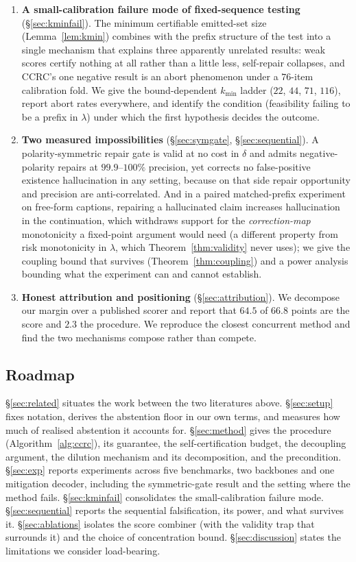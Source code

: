 \documentclass[review,number,doubleblind]{elsarticle}
\theoremstyle{plain}
\theoremstyle{definition}
\theoremstyle{remark}
\begin{document}
\begin{enumerate}
\item \textbf{A small-calibration failure mode of fixed-sequence testing}
(\S\ref{sec:kminfail}). The minimum certifiable emitted-set size (Lemma~\ref{lem:kmin})
combines with the prefix structure of the test into a single mechanism that explains three
apparently unrelated results: weak scores certify nothing at all rather than a little less,
self-repair collapses, and CCRC's one negative result is an abort phenomenon under a $76$-item
calibration fold. We give the bound-dependent $k_{\min}$ ladder ($22$, $44$, $71$, $116$),
report abort rates everywhere, and identify the condition (feasibility failing to be a prefix
in $\lambda$) under which the first hypothesis decides the outcome.

\item \textbf{Two measured impossibilities} (\S\ref{sec:symgate}, \S\ref{sec:sequential}). A
polarity-symmetric repair gate is valid at no cost in $\delta$ and admits negative-polarity
repairs at $99.9$--$100\%$ precision, yet corrects no false-positive existence hallucination
in any setting, because on that side repair opportunity and precision are anti-correlated.
And in a paired matched-prefix experiment on free-form captions, repairing a hallucinated
claim increases hallucination in the continuation, which withdraws support for the
\emph{correction-map} monotonicity a fixed-point argument would need (a different property
from risk monotonicity in $\lambda$, which Theorem~\ref{thm:validity} never uses); we give
the coupling bound that survives (Theorem~\ref{thm:coupling}) and a power analysis bounding
what the experiment can and cannot establish.

\item \textbf{Honest attribution and positioning} (\S\ref{sec:attribution}). We decompose
our margin over a published scorer and report that $64.5$ of $66.8$ points are the score and
$2.3$ the procedure. We reproduce the closest concurrent method \citep{bcea} and find the two
mechanisms compose rather than compete.
\end{enumerate}

\subsection{Roadmap}
\S\ref{sec:related} situates the work between the two literatures above.
\S\ref{sec:setup} fixes notation, derives the abstention floor in our own terms, and measures
how much of realised abstention it accounts for. \S\ref{sec:method} gives the procedure
(Algorithm~\ref{alg:ccrc}), its guarantee, the self-certification budget, the decoupling
argument, the dilution mechanism and its decomposition, and the precondition.
\S\ref{sec:exp} reports experiments across five benchmarks, two backbones and one mitigation
decoder, including the symmetric-gate result and the setting where the method fails.
\S\ref{sec:kminfail} consolidates the small-calibration failure mode.
\S\ref{sec:sequential} reports the sequential falsification, its power, and what survives it.
\S\ref{sec:ablations} isolates the score combiner (with the validity trap that surrounds it) and the
choice of concentration bound. \S\ref{sec:discussion} states the limitations we consider
load-bearing.
\end{document}
